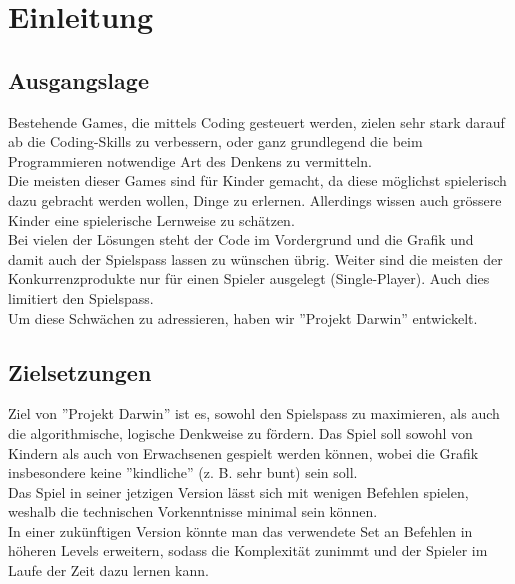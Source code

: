 \documentclass[11pt,a4paper,titlepage]{article}
\begin{document}

\newpage

\pagestyle{myheadings}

\section{Einleitung}
\subsection{Ausgangslage}


Bestehende Games, die mittels Coding gesteuert werden, zielen sehr stark darauf ab die Coding-Skills zu verbessern, oder ganz grundlegend die beim Programmieren notwendige Art des Denkens zu vermitteln.\\
Die meisten dieser Games sind für Kinder gemacht, da diese möglichst spielerisch dazu gebracht werden wollen, Dinge zu erlernen. Allerdings wissen auch grössere Kinder eine spielerische Lernweise zu schätzen. \\
Bei vielen der Lösungen steht der Code im Vordergrund und die Grafik und damit auch der Spielspass lassen zu wünschen übrig. 
Weiter sind die meisten der Konkurrenzprodukte nur für einen Spieler ausgelegt (Single-Player). Auch dies limitiert den Spielspass.\\
Um diese Schwächen zu adressieren, haben wir ''Projekt Darwin'' entwickelt.

\subsection{Zielsetzungen}



Ziel von ''Projekt Darwin'' ist es, sowohl den Spielspass zu maximieren, als auch die algorithmische, logische Denkweise zu fördern. Das Spiel soll sowohl von Kindern als auch von Erwachsenen gespielt werden können, wobei die Grafik insbesondere keine ''kindliche'' (z. B. sehr bunt) sein soll.\\
Das Spiel in seiner jetzigen Version lässt sich mit wenigen Befehlen spielen, weshalb die technischen Vorkenntnisse minimal sein können.\\
In einer zukünftigen Version könnte man das verwendete Set an Befehlen in höheren Levels erweitern, sodass die Komplexität zunimmt und der Spieler im Laufe der Zeit dazu lernen kann.
\end{document}
